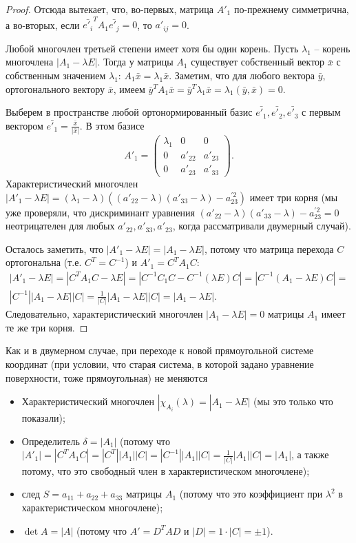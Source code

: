 \documentclass[a4paper, 12pt]{article}
\theoremstyle{definition}
\begin{document}
\begin{proof}
    Отсюда вытекает, что, во-первых, матрица $A'_1$ по-прежнему симметрична, а во-вторых, если $\bar{e'_i}^T A_1 \bar{e'_j} = 0$, то $a'_{ij} = 0$.

    Любой многочлен третьей степени имеет хотя бы один корень. Пусть $\lambda_1$ – корень многочлена $|A_1 - \lambda E|$.
    Тогда у матрицы $A_1$ существует собственный вектор $\bar{x}$ с собственным значением $\lambda_1$: $A_1 \bar{x} = \lambda_1 \bar{x}$.
    Заметим, что для любого вектора $\bar{y}$, ортогонального вектору $\bar{x}$, имеем $\bar{y}^T A_1 \bar{x} = \bar{y}^T \lambda_1 \bar{x} = \lambda_1 (\bar{y}, \bar{x}) = 0$.

    Выберем в пространстве любой ортонормированный базис $\bar{e'_1}, \bar{e'_2}, \bar{e'_3}$ с первым вектором $\bar{e'_1} = \frac{\bar{x}}{|\bar{x}|}$.
    В этом базисе
    \[A'_1 = 
    \begin{pmatrix}
        \lambda_1 & 0 & 0 \\
        0 & a'_{22} & a'_{23} \\
        0 & a'_{23} & a'_{33}
    \end{pmatrix}.
    \]
    Характеристический многочлен $|A'_1 - \lambda E| = (\lambda_1 - \lambda)((a'_{22} - \lambda)(a'_{33} - \lambda) - a_{23}^{'2})$ имеет три корня
    (мы уже проверяли, что дискриминант уравнения $(a'_{22} - \lambda)(a'_{33} - \lambda) - a_{23}^{'2} = 0$ неотрицателен для любых $a'_{22}, a'_{33}, a'_{23}$, когда рассматривали двумерный случай).

    Осталось заметить, что $|A'_1 - \lambda E| = |A_1 - \lambda E|$, потому что матрица перехода $C$ ортогональна (т.е. $C^T = C^{-1}$) и $A'_1 = C^T A_1 C$:
    \begin{multline*}
        |A'_1 - \lambda E| = |C^T A_1 C - \lambda E| = |C^{-1} C_1 C - C^{-1} (\lambda E) C| = |C^{-1} (A_1 - \lambda E) C| =\\ |C^{-1}| |A_1 - \lambda E| |C| = \frac{1}{|C|} |A_1 - \lambda E| |C| = |A_1 - \lambda E|.
    \end{multline*}
    Следовательно, характеристический многочлен $|A_1 - \lambda E| = 0$ матрицы $A_1$ имеет те же три корня.
\end{proof}

Как и в двумерном случае, при переходе к новой прямоугольной системе координат (при условии, что старая система, в которой задано уравнение поверхности, тоже прямоугольная) не меняются

\begin{itemize}
    \item Характеристический многочлен $| \chi_{A_i} (\lambda) = |A_1 - \lambda E|$ (мы это только что показали);
    \item Определитель $\delta = |A_1|$ (потому что $|A'_1| = |C^T A_1 C| = |C^T| |A_1| |C| = |C^{-1}| |A_1| |C| = \frac{1}{|C|} |A_1| |C| = |A_1|$, а также потому, что это свободный член в характеристическом многочлене);
    \item след $S = a_{11} + a_{22} + a_{33}$ матрицы $A_1$ (потому что это коэффициент при $\lambda^2$ в характеристическом многочлене);
    \item $\det{A} = |A|$ (потому что $A' = D^T A D$ и $|D| = 1 \cdot |C| = \pm 1$).
\end{itemize}
\end{document}
